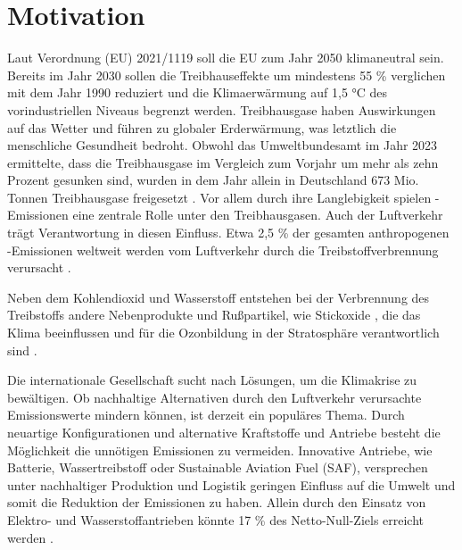 \chapter{Motivation}
\label{ch:Einleitung}

Laut Verordnung (EU) 2021/1119 soll die EU zum Jahr 2050 klimaneutral sein. Bereits im Jahr 2030 sollen die Treibhauseffekte um mindestens 55 \%
verglichen mit dem Jahr 1990 reduziert und die Klimaerwärmung auf 1,5 °C des vorindustriellen Niveaus begrenzt werden.
Treibhausgase haben Auswirkungen auf das Wetter und führen zu globaler Erderwärmung, was letztlich die menschliche Gesundheit bedroht. %
Obwohl das Umweltbundesamt im Jahr 2023 ermittelte, dass die Treibhausgase im Vergleich zum Vorjahr um mehr als zehn Prozent gesunken sind, 
wurden in dem Jahr allein in Deutschland 673 Mio. Tonnen Treibhausgase freigesetzt \cite{bundesregierung}.
Vor allem durch ihre Langlebigkeit \cite{filonchyk2024greenhouse} spielen -Emissionen eine zentrale Rolle unter den Treibhausgasen. 
Auch der Luftverkehr trägt Verantwortung in diesen Einfluss. 
Etwa 2,5 \% der gesamten anthropogenen -Emissionen weltweit werden vom Luftverkehr
durch die Treibstoffverbrennung verursacht \cite{conrady2019luftverkehr}. 

Neben dem Kohlendioxid  und Wasserstoff  entstehen bei der Verbrennung des Treibstoffs andere Nebenprodukte und Rußpartikel, wie Stickoxide ,
die das Klima beeinflussen und für die Ozonbildung in der Stratosphäre verantwortlich sind \cite{conrady2019luftverkehr}.

Die internationale Gesellschaft sucht nach Lösungen, um die Klimakrise zu bewältigen. 
Ob nachhaltige Alternativen durch den Luftverkehr verursachte Emissionswerte mindern können, ist derzeit ein populäres Thema.
Durch neuartige Konfigurationen und alternative Kraftstoffe und Antriebe besteht die Möglichkeit die unnötigen Emissionen zu vermeiden.
Innovative Antriebe, wie Batterie, Wassertreibstoff oder Sustainable Aviation Fuel (SAF), versprechen unter nachhaltiger Produktion und
Logistik geringen Einfluss auf die Umwelt und somit die Reduktion der Emissionen zu haben.
Allein durch den Einsatz von Elektro- und Wasserstoffantrieben könnte 17 \% des Netto-Null-Ziels erreicht werden \cite{gao2022hydrogen}.
%

